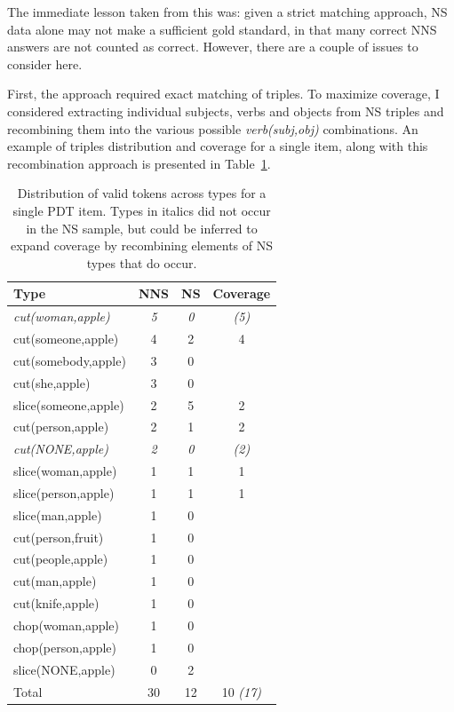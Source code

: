 The immediate lesson taken from this was: given a strict matching approach, NS data alone may not make a sufficient gold standard, in that many correct NNS answers are not counted as
correct.  However, there are a couple of issues to consider here.

First, the approach required exact matching of triples.  To maximize coverage, I considered extracting individual subjects, verbs and objects from NS
triples and recombining them into the various possible
\textit{verb(subj,obj)} combinations. An example of triples distribution and coverage for a
single item, along with this recombination approach is presented in
Table~\ref{tab:item8types}.
\begin{table}[htb!]
\begin{center}
\begin{tabular}{|l|c|c|c|}
  \hline
  Type & NNS & NS & Coverage \\
  \hline
  \hline
\textit{cut(woman,apple)} & \textit{5} & \textit{0} & \textit{(5)} \\
 \hline
 cut(someone,apple) & 4 & 2 & 4 \\
 \hline
 cut(somebody,apple) & 3 & 0 & \\
 \hline
 cut(she,apple) & 3 & 0 & \\
 \hline
 slice(someone,apple) & 2 & 5 & 2 \\
 \hline
 cut(person,apple) & 2 & 1 & 2\\
 \hline
 \textit{cut(NONE,apple)} & \textit{2} & \textit{0} & \textit{(2)} \\
 \hline
 slice(woman,apple) & 1 & 1 & 1 \\
 \hline
 slice(person,apple) & 1 & 1 & 1 \\
 \hline
 slice(man,apple) & 1 & 0 & \\
 \hline
 cut(person,fruit) & 1 & 0 & \\
 \hline
 cut(people,apple) & 1 & 0 & \\
 \hline
 cut(man,apple) & 1 & 0 & \\
 \hline
 cut(knife,apple) & 1 & 0 & \\
 \hline
 chop(woman,apple) & 1 & 0 & \\
 \hline
 chop(person,apple) & 1 & 0 & \\
 \hline
 slice(NONE,apple) & 0 & 2 & \\
 \hline
 Total  &  30 & 12 & 10 \textit{(17)} \\
 \hline
\end{tabular}
\end{center}
\caption{Distribution of valid tokens across types for a single PDT item. Types in italics did not occur in the NS sample, but could be inferred to expand coverage by recombining elements of NS types that do occur.}
\label{tab:item8types}
\end{table}

